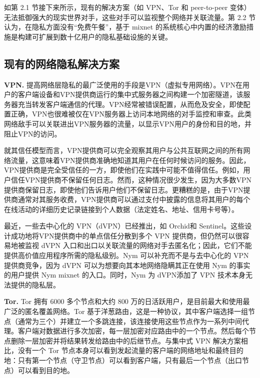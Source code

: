 \documentclass{article}
\begin{document}
	如第 2.1 节接下来所示，现有的解决方案（如 VPN、Tor 和 peer-to-peer 变体）无法抵御强大的现实世界对手，这些对手可以监视整个网络并关联流量。第 2.2 节认为，在隐私方面没有“免费午餐”，基于 mixnet 的系统核心中内置的经济激励措施是构建可扩展到数十亿用户的隐私基础设施的关键。\newline
	
	\subsection{现有的网络隐私解决方案}
	
	\textbf{VPN.} 提高网络层隐私的最广泛使用的手段是VPN（虚拟专用网络）。VPN在用户的客户端设备和VPN提供商运行的集中式服务器之间构建一个加密隧道，该服务器充当转发客户端通信的代理。VPN经常被错误配置，从而危及安全\cite{ref68, ref86}，即使配置正确，VPN也很难被仅在VPN服务器上访问本地网络的对手监控和审查。此类网络敌手可以关联进出VPN服务器的流量，以显示VPN用户的身份和目的地，并阻止VPN的访问\cite{ref65}。\newline

	就其信任模型而言，VPN提供商可以完全观察其用户与公共互联网之间的所有网络流量，这意味着VPN提供商准确地知道其用户在任何时候访问的服务。因此，VPN提供商是完全受信任的一方，即使他们在实践中可能不值得信任。例如，用户信任VPN提供商不保留任何日志。然而，这种情况很少发生，因为大多数VPN提供商保留日志，即使他们告诉用户他们不保留日志\cite{ref76}。更糟糕的是，由于VPN提供商通常对其服务收费，VPN提供商可以通过支付中披露的信息将其用户的每个在线活动的详细历史记录链接到个人数据（法定姓名、地址、信用卡号等）。\newline

	最近，一些去中心化的 VPN（dVPN）已经推出，如 Orchid\cite{ref15}和 Sentinel\cite{ref39}。这些设计成功地将VPN提供商中的单点信任分散到多个 VPN 提供商，但仍然可以很容易地被监视 dVPN 入口和出口以关联流量的网络对手去匿名化；因此，它们不能提供高价值应用程序所需的隐私级别。Nym 可以补充而不是与去中心化的 VPN 提供商竞争，因为 dVPN 可以为想要向其本地网络隐瞒其正在使用 Nym 的事实的用户提供 Nym mixnet 的入口。同时，Nym 为 dVPN添加了 VPN 技术本身无法提供的隐私层。\newline

	\textbf{Tor.} Tor 拥有 6000 多个节点和大约 800 万的日活跃用户\cite{ref75}，是目前最大和使用最广泛的匿名覆盖网络\cite{ref42}。Tor 基于洋葱路由\cite{ref49}，这是一种协议，其中客户端选择一组节点（通常为三个）并建立一个多跳连接，该连接使用这些节点作为一系列中间代理。客户端对数据进行多次加密，每一层加密对应路由中的一个节点。然后每个节点删除一层加密并将结果转发给路由中的后继节点。与集中式 VPN 解决方案相比，没有一个 Tor 节点本身可以看到发起流量的客户端的网络地址和最终目的地：只有第一个节点（守卫节点）可以看到客户端，只有最后一个节点（出口节点）可以看到目的地。\newline
\end{document}
